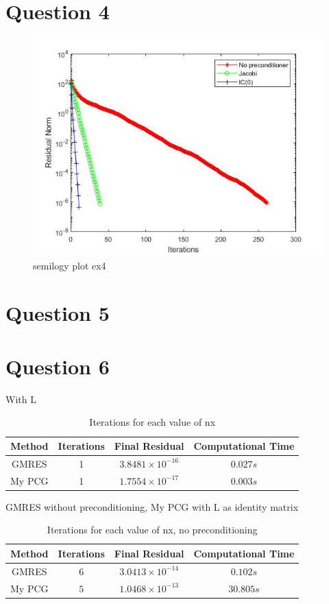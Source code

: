 \documentclass[a4paper, 11pt]{article}
\begin{document}
		
		
		
		\section*{Question 4}		
		\begin{figure}[H]
			\centering
			\includegraphics[width=.6\linewidth]{ex4.jpg}
			\caption{semilogy plot ex4}
			\label{fig:ex4}
		\end{figure}
		
		
		\section*{Question 5}
		
		
		\section*{Question 6}
		
			
		
		With L
		
		\begin{table}[H]
			\centering
			\begin{tabular}{c|c|c|c}
				\textbf{Method} &  \textbf{Iterations} 	& \textbf{Final Residual} 		& \textbf{Computational Time} 	\\ \hline
				GMRES 			& 			1 			& $ 3.8481 \times 10^{-16} $	& $ 0.027 s $	\\ \hline	
				My PCG 			& 			1			& $ 1.7554 \times 10^{-17} $	& $ 0.003 s $	\\ \hline
			\end{tabular}
			\caption{Iterations for each value of nx}
			\label{table:ex4_c_prec}
		\end{table}	
	
		GMRES without preconditioning, My PCG with L as identity matrix
			
		\begin{table}[H]
			\centering
			\begin{tabular}{c|c|c|c}
				\textbf{Method} &  \textbf{Iterations} 	& \textbf{Final Residual} 		& \textbf{Computational Time} 	\\ \hline
				GMRES			& 			$6$ 		& $ 3.0413 \times 10^{-14} $ 	& $ 0.102 s $	\\ \hline	
				My PCG 			& 			$5$			& $ 1.0468 \times 10^{-13} $	& $ 30.805 s $	\\ \hline
			\end{tabular}
			\caption{Iterations for each value of nx, no preconditioning}
			\label{table:ex4_c_NoPrec}
		\end{table}
	
\end{document}
